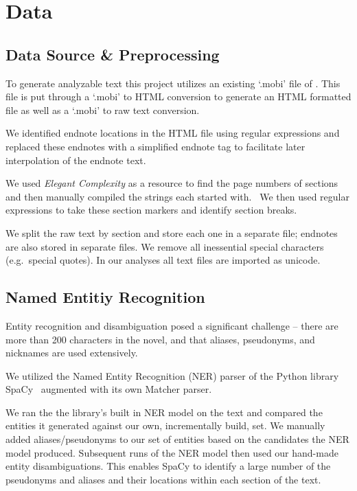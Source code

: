 \section{Data}

\subsection{Data Source \& Preprocessing}

To generate analyzable text this project utilizes an existing `.mobi' file of \infinitejest. This file is put through a `.mobi' to HTML conversion to generate an HTML formatted file as well as a `.mobi' to raw text conversion.

We identified endnote locations in the HTML file using regular expressions and replaced these endnotes with a simplified endnote tag to facilitate later interpolation of the endnote text.

We used \textit{Elegant Complexity} as a resource to find the page numbers of sections and then manually compiled the strings each started with.~\cite{carlisle_2007} We then used regular expressions to take these section markers and identify section breaks.

We split the raw text by section and store each one in a separate file; endnotes are also stored in separate files. We remove all inessential special characters (e.g.\ special quotes). In our analyses all text files are imported as unicode.

\subsection{Named Entitiy Recognition}

Entity recognition and disambiguation posed a significant challenge -- there are more than 200 characters in the novel, and that aliases, pseudonyms, and nicknames are used extensively. 

We utilized the Named Entity Recognition (NER) parser of the Python library SpaCy~\cite{spacy2} augmented with its own Matcher parser.

We ran the the library's built in NER model on the text and compared the entities it generated against our own, incrementally build, set. We manually added aliases/pseudonyms to our set of entities based on the candidates the NER model produced. Subsequent runs of the NER model then used our hand-made entity disambiguations. This enables SpaCy to identify a large number of the pseudonyms and aliases and their locations within each section of the text.

